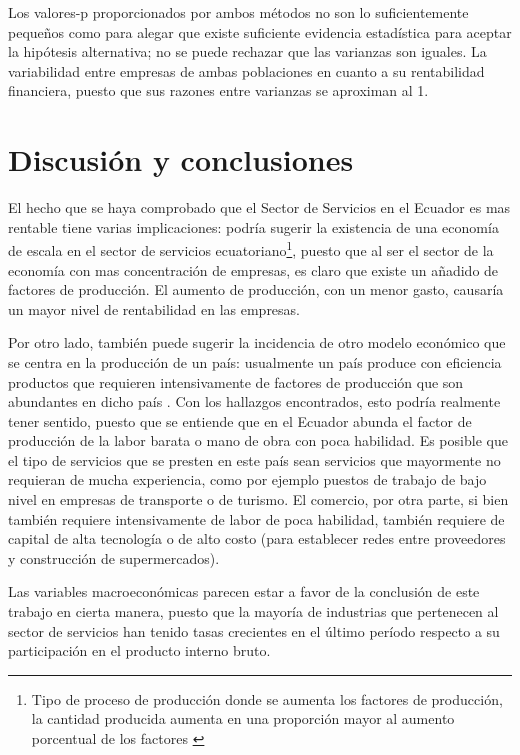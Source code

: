 \documentclass[12pt,a4paper,twoside]{article}
\begin{document}
Los valores-p proporcionados por ambos métodos no son lo suficientemente pequeños como para alegar que existe suficiente evidencia estadística para aceptar la hipótesis alternativa; no se puede rechazar que las varianzas son iguales. La variabilidad entre empresas de ambas poblaciones en cuanto a su rentabilidad financiera, puesto que sus razones entre varianzas se aproximan al 1. 
\section{Discusión y conclusiones}
El hecho que se haya comprobado que el Sector de Servicios en el Ecuador es mas rentable tiene varias implicaciones: podría sugerir la existencia de una economía de escala en el sector de servicios ecuatoriano\footnote{Tipo de proceso de producción donde se aumenta los factores de producción, la cantidad producida aumenta en una proporción mayor al aumento porcentual de los factores \parencite{principiosdemankiw}}, puesto que al ser el sector de la economía con mas concentración de empresas, es claro que existe un añadido de factores de producción. El aumento de producción, con un menor gasto, causaría un mayor nivel de rentabilidad en las empresas.

Por otro lado, también puede sugerir la incidencia de otro modelo económico que se centra en la producción de un país: usualmente un país produce con eficiencia productos que requieren intensivamente de factores de producción que son abundantes en dicho país \parencite{internationaltradekrugman&obstfeld&melitz}. Con los hallazgos encontrados, esto podría realmente tener sentido, puesto que se entiende que en el Ecuador abunda el factor de producción de la labor barata o mano de obra con poca habilidad. Es posible que el tipo de servicios que se presten en este país sean servicios que mayormente no requieran de mucha experiencia, como por ejemplo puestos de trabajo de bajo nivel en empresas de transporte o de turismo. El comercio, por otra parte, si bien también requiere intensivamente de labor de poca habilidad, también requiere de capital de alta tecnología o de alto costo (para establecer redes entre proveedores y construcción de supermercados). 

Las variables macroeconómicas parecen estar a favor de la conclusión de este trabajo en cierta manera, puesto que la mayoría de industrias que pertenecen al sector de servicios han tenido tasas crecientes en el último período respecto a su participación en el producto interno bruto. 
\end{document}
